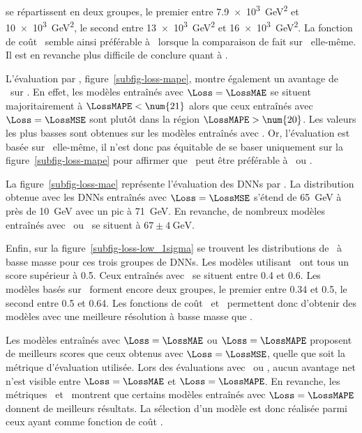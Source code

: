 se répartissent en deux groupes,
le premier
entre \SI{7.9e3}{\GeV^2} et \SI{10e3}{\GeV^2},
le second
entre \SI{13e3}{\GeV^2} et \SI{16e3}{\GeV^2}.
La fonction de coût \LossMAE\ semble ainsi préférable à \LossMSE\ lorsque la comparaison de fait sur \LossMSE\ elle-même.
Il est en revanche plus difficile de conclure quant à \LossMAPE.
\par
L'évaluation par \LossMAPE, figure~\ref{subfig-loss-mape},
montre également un avantage de \LossMAE\ sur \LossMSE.
En effet, les modèles
entraînés avec $\Loss=\LossMAE$
se situent majoritairement à $\LossMAPE<\num{21}$
alors que ceux
entraînés avec $\Loss=\LossMSE$
sont plutôt dans la région $\LossMAPE>\num{20}$.
Les valeurs les plus basses sont obtenues sur les modèles entraînés avec \LossMAPE.
Or, l'évaluation est basée sur \LossMAPE\ elle-même,
il n'est donc pas équitable de se baser uniquement sur la figure~\ref{subfig-loss-mape}
pour affirmer que \LossMAPE\ peut être préférable à \LossMAE\ ou \LossMSE.
\par
La figure~\ref{subfig-loss-mae} représente l'évaluation des DNNs par \LossMAE.
La distribution obtenue avec les DNNs entraînés avec $\Loss=\LossMSE$
s'étend de \SI{65}{\GeV} à près de \SI{10}{\GeV} avec un pic à \SI{71}{\GeV}.
En revanche, de nombreux modèles entraînés avec \LossMAE\ ou \LossMAPE\
se situent à $\num{67}\pm\SI{4}{\GeV}$.
\par
Enfin,
sur la figure~\ref{subfig-loss-low_1sigma} se trouvent les distributions
de \OneSigmaWidth\ à basse masse pour ces trois groupes de DNNs.
Les modèles utilisant \LossMSE\ ont tous un score supérieur à \num{0.5}.
Ceux entraînés avec \LossMAE\ se situent entre \num{0.4} et \num{0.6}.
Les modèles basés sur \LossMAPE\ forment encore deux groupes,
le premier entre \num{0.34} et \num{0.5},
le second entre \num{0.5} et \num{0.64}.
Les fonctions de coût \LossMAPE\ et \LossMAE\ permettent donc d'obtenir des modèles avec une meilleure résolution à basse masse que \LossMSE.
\par
Les modèles entraînés avec $\Loss=\LossMAE$ ou $\Loss=\LossMAPE$
proposent de meilleurs scores que ceux obtenus avec $\Loss=\LossMSE$,
quelle que soit la métrique d'évaluation utilisée.
Lors des évaluations avec \LossMSE\ ou \LossMAE,
aucun avantage net n'est visible entre $\Loss=\LossMAE$ et $\Loss=\LossMAPE$.
En revanche, les métriques \LossMAPE\ et \OneSigmaWidth\ montrent que certains modèles
entraînés avec $\Loss=\LossMAPE$
donnent de meilleurs résultats.
La sélection d'un modèle est donc réalisée parmi ceux ayant comme fonction de coût \LossMAPE.
